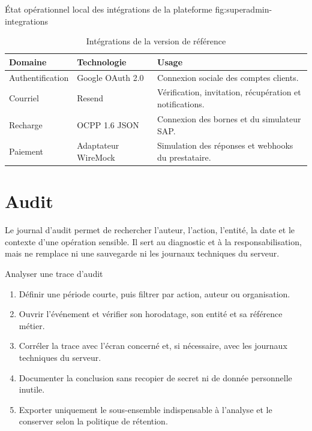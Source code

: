   {État opérationnel local des intégrations de la plateforme}
  {fig:superadmin-integrations}

\begin{table}[H]
  \centering
  \caption{Intégrations de la version de référence}
  \label{tab:integrations}
  \begin{tabularx}{\textwidth}{|L{3.5cm}|L{4.2cm}|Y|}
    \hline
    \textbf{Domaine} & \textbf{Technologie} & \textbf{Usage} \\ \hline
    Authentification & Google OAuth 2.0 & Connexion sociale des comptes clients.
    \\ \hline
    Courriel & Resend & Vérification, invitation, récupération et notifications.
    \\ \hline
    Recharge & OCPP 1.6 JSON & Connexion des bornes et du simulateur SAP. \\ \hline
    Paiement & Adaptateur WireMock & Simulation des réponses et webhooks du
    prestataire. \\ \hline
  \end{tabularx}
\end{table}

\clearpage
\section{Audit}

Le journal d'audit permet de rechercher l'auteur, l'action, l'entité, la date et
le contexte d'une opération sensible. Il sert au diagnostic et à la
responsabilisation, mais ne remplace ni une sauvegarde ni les journaux
techniques du serveur.

\begin{procedurebox}{Analyser une trace d'audit}
  \begin{enumerate}[leftmargin=*]
    \item Définir une période courte, puis filtrer par action, auteur ou
    organisation.
    \item Ouvrir l'événement et vérifier son horodatage, son entité et sa
    référence métier.
    \item Corréler la trace avec l'écran concerné et, si nécessaire, avec les
    journaux techniques du serveur.
    \item Documenter la conclusion sans recopier de secret ni de donnée
    personnelle inutile.
    \item Exporter uniquement le sous-ensemble indispensable à l'analyse et le
    conserver selon la politique de rétention.
  \end{enumerate}
\end{procedurebox}

